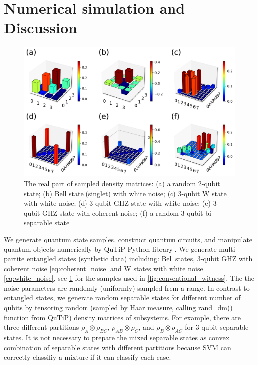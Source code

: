\documentclass[
aps,
pra,
twocolumn,
floatfix,
]{revtex4-2}
\theoremstyle{plain}
\theoremstyle{definition}
\newcommand{\dm}{\rho}
\begin{document}
\section{Numerical simulation and Discussion}\label{sec:numerical_simulation}
\begin{figure}[!ht]
	\centering
	\includegraphics[width=.9\linewidth]{./Code/dataset_sample_3x2.png}
	\caption{The real part of sampled density matrices: (a) a random 2-qubit state; (b) Bell state (singlet) with white noise; (c) 3-qubit W state with white noise; (d) 3-qubit GHZ state with white noise; (e) 3-qubit GHZ state with coherent noise; (f) a random 3-qubit bi-separable state}
	\label{fig:sample_data}
\end{figure}
We generate quantum state samples, construct quantum circuits, and manipulate quantum objects numerically by QuTiP Python library \cite{johanssonQuTiPPythonFramework2013} \cite{liPulselevelNoisyQuantum2022}.
We generate multi-partite entangled states (synthetic data) including: Bell states, 3-qubit GHZ with coherent noise \cref{eq:coherent_noise} and W states with white noise \cref{eq:white_noise}, see \cref{fig:sample_data} for the samples used in \cref{fig:conventional_witness}.
The the noise parameters are randomly (uniformly) sampled from a range.
In contrast to entangled states, we generate random separable states for different number of qubits by tensoring random (sampled by Haar measure, calling \textsf{rand\_dm()} function from QuTiP) density matrices of subsystems.
For example,
there are three different partitions $\dm_A\otimes \dm_{BC}$, $\dm_{AB}\otimes \dm_{C}$, and $\dm_B\otimes \dm_{AC}$ for 3-qubit separable states.
It is not necessary to prepare the mixed separable states as convex combination of separable states with different partitions 
because SVM can correctly classifiy a mixture if it can classify each case.
\end{document}
